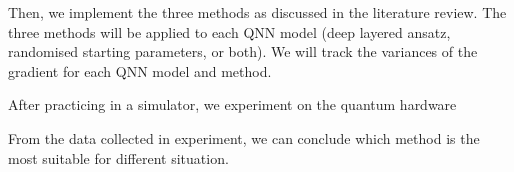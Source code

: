 
Then, we implement the three methods as discussed in the literature review.
The three methods will be applied to each QNN model (deep layered ansatz, randomised starting parameters, or both).
We will track the variances of the gradient for each QNN model and method.

After practicing in a simulator, we experiment on the quantum hardware

From the data collected in experiment, we can conclude which method is the most suitable for different situation.

